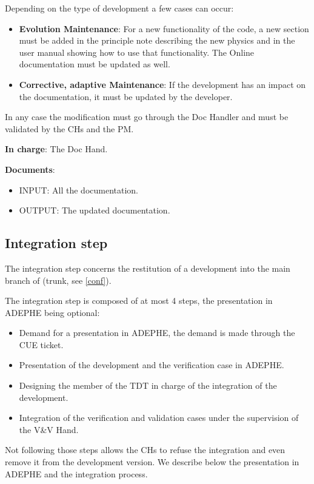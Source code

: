 Depending on the type of development a few cases can occur:
\begin{itemize}
\item \textbf{Evolution Maintenance}: For a new functionality of the code, a
new section must be added in the principle note describing the new physics and in
the user manual showing how to use that functionality. The Online documentation must
be updated as well.
\item \textbf{Corrective, adaptive Maintenance}: If the development has an
impact on the documentation, it must be updated by the developer.
\end{itemize}

In any case the modification must go through the Doc Handler and must be
validated by the CHs and the PM.

\textbf{In charge}: The Doc Hand.

\textbf{Documents}:
\begin{itemize}
\item INPUT: All the documentation.
\item OUTPUT: The updated documentation.
\end{itemize}

\subsection{Integration step}

The integration step concerns the restitution of a development into the
main branch of \telemacsystem (trunk, see \ref{conf}).

The integration step is composed of at most 4 steps, the presentation in ADEPHE
being optional:
\begin{itemize}
\item Demand for a presentation in ADEPHE, the demand is made through the CUE
ticket.
\item Presentation of the development and the verification case in ADEPHE.
\item Designing the member of the TDT in charge of the integration of the
development.
\item Integration of the verification and validation cases under the
supervision of the V\&V Hand.
\end{itemize}

Not following those steps allows the CHs to refuse the integration and even
remove it from the development version. We describe below the presentation in
ADEPHE and the integration process.

